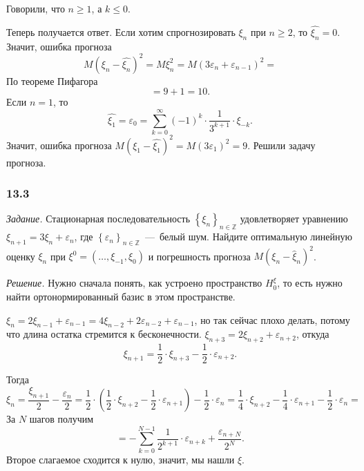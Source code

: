 Говорили, что $n \geq 1$, а $k \leq 0$.

Теперь получается ответ.
Если хотим спрогнозировать $ \xi_n$ при $n \geq 2$, то $ \hat{ \xi_n} = 0$.
Значит, ошибка прогноза
\begin{equation*}
  M \left( \xi_n - \hat{ \xi_n} \right)^2 =
  M \xi_n^2 =
  M \left( 3 \varepsilon_n + \varepsilon_{n - 1} \right)^2 =
\end{equation*}
По теореме Пифагора
\begin{equation*}
  = 9 + 1 =
  10.
\end{equation*}
Если $n = 1$, то
\begin{equation*}
  \hat{ \xi_1} =
  \varepsilon_0 =
  \sum \limits_{k = 0}^{ \infty } \left( -1 \right)^k \cdot \frac{1}{3^{k + 1}} \cdot \xi_{-k}.
\end{equation*}
Значит,
ошибка прогноза $M \left( \xi_1 - \hat{ \xi_1} \right)^2 = M \left( 3 \varepsilon_1 \right)^2 = 9$.
Решили задачу прогноза.

\subsubsection*{13.3}

\textit{Задание.}
Стационарная последовательность $ \left\{ \xi_n \right\}_{n \in \mathbb{Z}}$
удовлетворяет уравнению $ \xi_{n + 1} = 3 \xi_n + \varepsilon_n$,
где $ \left\{ \varepsilon_n \right\}_{n \in \mathbb{Z}}$~---~белый шум.
Найдите оптимальную линейную оценку $ \xi_n$ при $ \xi^0 = \left( \dotsc, \xi_{-1}, \xi_0 \right) $
и погрешность прогноза $M \left( \xi_n - \hat{ \xi }_n \right)^2$.

\textit{Решение.}
Нужно сначала понять, как устроено пространство $H_0^{ \xi }$,
то есть нужно найти ортонормированный базис в этом пространстве.

$ \xi_n =
  2 \xi_{n - 1} + \varepsilon_{n - 1} =
  4 \xi_{n - 2} + 2 \varepsilon_{n - 2} + \varepsilon_{n - 1}$,
но так сейчас плохо делать, потому что длина остатка стремится к бесконечности.
$ \xi_{n + 3} = 2 \xi_{n + 2} + \varepsilon_{n + 2}$, откуда
\begin{equation*}
  \xi_{n + 1} =
  \frac{1}{2} \cdot \xi_{n + 3} - \frac{1}{2} \cdot \varepsilon_{n + 2}.
\end{equation*}

Тогда
\begin{equation*}
  \xi_n =
  \frac{ \xi_{n + 1}}{2} - \frac{ \varepsilon_n}{2} =
  \frac{1}{2} \cdot
  \left( \frac{1}{2} \cdot \xi_{n + 2} - \frac{1}{2} \cdot \varepsilon_{n + 1 } \right) -
  \frac{1}{2} \cdot \varepsilon_n =
  \frac{1}{4} \cdot \xi_{n + 2} - \frac{1}{4} \cdot \varepsilon_{n + 1} -
  \frac{1}{2} \cdot \varepsilon_n =
\end{equation*}
За $N$ шагов получим
\begin{equation*}
  = -\sum \limits_{k = 0}^{N - 1} \frac{1}{2^{k + 1}} \cdot \varepsilon_{n + k} +
  \frac{ \varepsilon_{n + N}}{2^N}.
\end{equation*}
Второе слагаемое сходится к нулю, значит, мы нашли $ \xi $.

